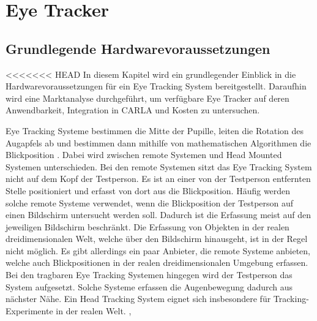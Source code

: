 \chapter{Eye Tracker}
\label{sec:eye tracker}

\section{Grundlegende Hardwarevoraussetzungen}

<<<<<<< HEAD
In diesem Kapitel wird ein grundlegender Einblick in die Hardwarevoraussetzungen für ein Eye Tracking System bereitgestellt. Daraufhin wird eine Marktanalyse durchgeführt, um verfügbare Eye Tracker auf deren Anwendbarkeit, Integration in CARLA und Kosten zu untersuchen.

Eye Tracking Systeme bestimmen die Mitte der Pupille, leiten die Rotation des Augapfels ab und bestimmen dann mithilfe von mathematischen Algorithmen die Blickposition \cite{lit_website_eyeware_eyetracker_blog}. Dabei wird zwischen remote Systemen und Head Mounted Systemen unterschieden. Bei den remote Systemen sitzt das Eye Tracking System nicht auf dem Kopf der Testperson. Es ist an einer von der Testperson entfernten Stelle positioniert und erfasst von dort aus die Blickposition. Häufig werden solche remote Systeme verwendet, wenn die Blickposition der Testperson auf einen Bildschirm untersucht werden soll. Dadurch ist die Erfassung meist auf den jeweiligen Bildschirm beschränkt. Die Erfassung von Objekten in der realen dreidimensionalen Welt, welche über den Bildschirm hinausgeht, ist in der Regel nicht möglich. Es gibt allerdings ein paar Anbieter, die remote Systeme anbieten, welche auch Blickpositionen in der realen dreidimensionalen Umgebung erfassen. Bei den  tragbaren Eye Tracking Systemen hingegen wird der Testperson das System aufgesetzt. Solche Systeme erfassen die Augenbewegung dadurch aus nächster Nähe. Ein Head Tracking System eignet sich insbesondere für Tracking-Experimente in der realen Welt. \cite{lit_website_eyeware_eyetracker_blog},\cite{lit_website_bitbrain}

